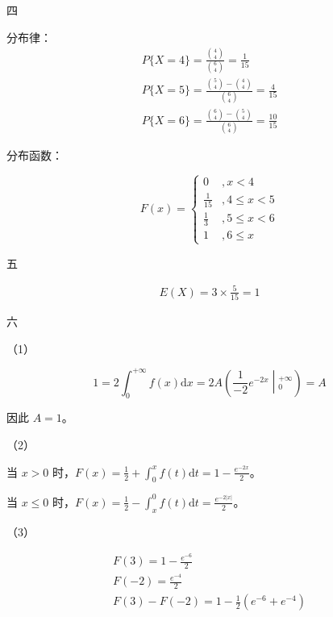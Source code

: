 \documentclass[UTF-8]{ctexart}
\begin{document}
四



分布律：
\begin{gather*}
P\{X=4\} =\frac{\binom{4}{4}}{\binom{6}{4}} =\frac{1}{15}\\
P\{X=5\} =\frac{\binom{5}{4} -\binom{4}{4}}{\binom{6}{4}} =\frac{4}{15}\\
P\{X=6\} =\frac{\binom{6}{4} -\binom{5}{4}}{\binom{6}{4}} =\frac{10}{15}
\end{gather*}

分布函数：


\begin{equation*}
F( x) =\begin{cases}
0 & ,x< 4\\
\frac{1}{15} & ,4\leqslant x< 5\\
\frac{1}{3} & ,5\leqslant x< 6\\
1 & ,6\leqslant x
\end{cases}
\end{equation*}


五




\begin{gather*}
	E(X)=3\times\frac{5}{15}=1
\end{gather*}


六



（1）


\begin{equation*}
1=2\int _{0}^{+\infty } f( x)\mathrm{d} x=2A\left(\frac{1}{-2} e^{-2x}\middle| _{0}^{+\infty }\right) =A
\end{equation*}

因此 $\displaystyle A=1$。



（2）

当 $\displaystyle x >0$ 时，$\displaystyle F( x) =\frac{1}{2} +\int _{0}^{x} f( t)\mathrm{d} t=1-\frac{e^{-2x}}{2}$。

当 $\displaystyle x\leqslant 0$ 时，$\displaystyle F( x) =\frac{1}{2} -\int _{x}^{0} f( t)\mathrm{d} t=\frac{e^{-2|x|}}{2}$。

（3）


\begin{gather*}
F( 3) =1-\frac{e^{-6}}{2}\\
F( -2) =\frac{e^{-4}}{2}\\
F( 3) -F( -2) =1-\frac{1}{2}\left( e^{-6} +e^{-4}\right)
\end{gather*}
\end{document}
